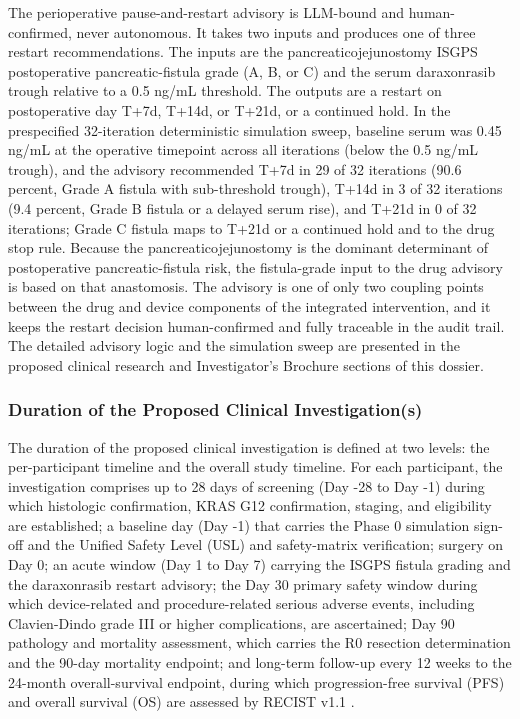 The perioperative pause-and-restart advisory is LLM-bound and human-confirmed, never
autonomous. It takes two inputs and produces one of three restart recommendations.
The inputs are the pancreaticojejunostomy ISGPS postoperative pancreatic-fistula
grade (A, B, or C) and the serum daraxonrasib trough relative to a 0.5 ng/mL
threshold. The outputs are a restart on postoperative day T+7d, T+14d, or T+21d, or
a continued hold. In the prespecified 32-iteration deterministic simulation sweep,
baseline serum was 0.45 ng/mL at the operative timepoint across all iterations
(below the 0.5 ng/mL trough), and the advisory recommended T+7d in 29 of 32
iterations (90.6 percent, Grade A fistula with sub-threshold trough), T+14d in 3 of
32 iterations (9.4 percent, Grade B fistula or a delayed serum rise), and T+21d in 0
of 32 iterations; Grade C fistula maps to T+21d or a continued hold and to the drug
stop rule. Because the pancreaticojejunostomy is the dominant determinant of
postoperative pancreatic-fistula risk, the fistula-grade input to the drug advisory
is based on that anastomosis. The advisory is one of only two coupling points
between the drug and device components of the integrated intervention, and it keeps
the restart decision human-confirmed and fully traceable in the audit trail. The
detailed advisory logic and the simulation sweep are presented in the proposed
clinical research and Investigator's Brochure sections of this dossier.

\subsubsection{Duration of the Proposed Clinical Investigation(s)}

The duration of the proposed clinical investigation is defined at two levels: the
per-participant timeline and the overall study timeline. For each participant, the
investigation comprises up to 28 days of screening (Day -28 to Day -1) during which
histologic confirmation, KRAS G12 confirmation, staging, and eligibility are
established; a baseline day (Day -1) that carries the Phase 0 simulation sign-off
and the Unified Safety Level (USL) and safety-matrix verification; surgery on Day 0;
an acute window (Day 1 to Day 7) carrying the ISGPS fistula grading and the
daraxonrasib restart advisory; the Day 30 primary safety window during which
device-related and procedure-related serious adverse events, including Clavien-Dindo
grade III or higher complications, are ascertained; Day 90 pathology and mortality
assessment, which carries the R0 resection determination and the 90-day mortality
endpoint; and long-term follow-up every 12 weeks to the 24-month overall-survival
endpoint, during which progression-free survival (PFS) and overall survival (OS)
are assessed by RECIST v1.1 \cite{daraxwhipple}.

